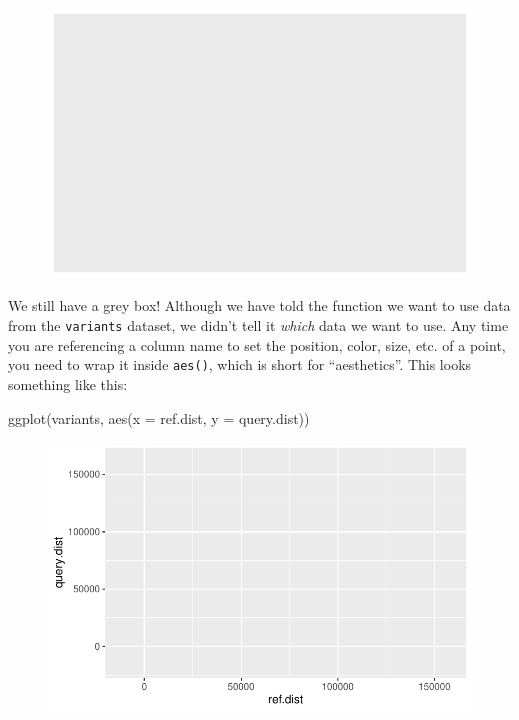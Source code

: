 \documentclass[
  letterpaper,
  DIV=11,
  numbers=noendperiod]{scrreprt}
\newenvironment{Shaded}{\begin{snugshade}}{\end{snugshade}}
\newcommand{\AttributeTok}[1]{\textcolor[rgb]{0.40,0.45,0.13}{#1}}
\newcommand{\FunctionTok}[1]{\textcolor[rgb]{0.28,0.35,0.67}{#1}}
\newcommand{\NormalTok}[1]{\textcolor[rgb]{0.00,0.23,0.31}{#1}}
\begin{document}
\begin{figure}[H]

{\centering \includegraphics{scripts/02_dataViz/class3_files/figure-pdf/unnamed-chunk-8-1.pdf}

}

\end{figure}

We still have a grey box! Although we have told the function we want to
use data from the \texttt{variants} dataset, we didn't tell it
\emph{which} data we want to use. Any time you are referencing a column
name to set the position, color, size, etc. of a point, you need to wrap
it inside \texttt{aes()}, which is short for ``aesthetics''. This looks
something like this:

\begin{Shaded}
\begin{Highlighting}[]
\FunctionTok{ggplot}\NormalTok{(variants, }\FunctionTok{aes}\NormalTok{(}\AttributeTok{x =}\NormalTok{ ref.dist, }\AttributeTok{y =}\NormalTok{ query.dist))}
\end{Highlighting}
\end{Shaded}

\begin{figure}[H]

{\centering \includegraphics{scripts/02_dataViz/class3_files/figure-pdf/unnamed-chunk-9-1.pdf}

}

\end{figure}
\end{document}
